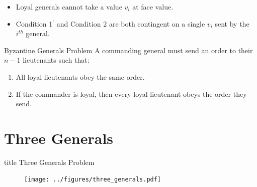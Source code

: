 \documentclass{beamer}
\theoremstyle{conjecture1}
\theoremstyle{conjecture2}
\begin{document}
\begin{frame}
    \begin{itemize}[label={$\bullet$}]
        \item Loyal generals cannot take a value $v_i$ at face value.
        \item<2-> {
            Condition 1$^\prime$ and Condition 2 are both contingent on a single $v_i$ sent by the $i^{th}$
            general.
        } 
    \end{itemize}
\end{frame}

\begin{frame}
    \begin{block}{Byzantine Generals Problem}
         {A commanding general must send an order to their $n - 1$ lieutenants such that:}

         {
            \begin{enumerate}[label={IC\arabic{enumi}.}]
                \item<3-> All loyal lieutenants obey the same order.
                \item<4-> If the commander is loyal, then every loyal lieutenant obeys the order they send.
            \end{enumerate}
        }
    \end{block}
\end{frame}


\section{Three Generals}

\begin{frame}
    \vfill
    \centering
    \begin{beamercolorbox}[sep=8pt,center,shadow=true,rounded=true]{title}
        Three Generals Problem\par%
    \end{beamercolorbox}

    \begin{figure}
        \centering
        \texttt{[image: ../figures/three\_generals.pdf]}
    \end{figure}
\end{frame}
\end{document}
